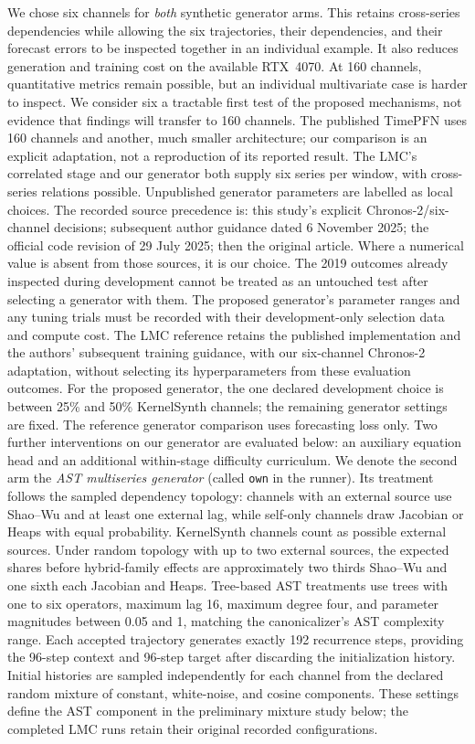 We chose six channels for \emph{both} synthetic generator arms. This retains
cross-series dependencies while allowing the six trajectories, their
dependencies, and their forecast errors to be inspected together in an
individual example. It also reduces generation and training cost on the
available RTX~4070. At 160 channels, quantitative metrics remain possible,
but an individual multivariate case is harder to inspect. We consider six a
tractable first test of the proposed mechanisms, not evidence that findings
will transfer to 160 channels. The published TimePFN uses 160 channels and
another, much smaller architecture; our comparison is an explicit adaptation,
not a reproduction of its reported result. The LMC's correlated stage and
our generator both supply six series per window, with cross-series relations
possible. Unpublished generator parameters are labelled as local
choices. The recorded source precedence is: this study's explicit
Chronos-2/six-channel decisions; subsequent author guidance dated
6 November 2025; the official code revision of 29 July 2025; then the
original article. Where a numerical value is absent from those sources,
it is our choice. The 2019 outcomes already inspected during development
cannot be treated as an untouched test after selecting a generator with them.
The proposed generator's parameter ranges and any tuning trials
must be recorded with their development-only selection data and compute
cost. The LMC reference retains the published implementation and the authors'
subsequent training guidance, with our six-channel Chronos-2 adaptation,
without selecting its hyperparameters from these evaluation outcomes. For the
proposed generator, the one declared development choice is between 25\% and
50\% KernelSynth channels; the remaining generator settings are fixed. The
reference generator comparison uses forecasting loss only. Two further
interventions on our generator are evaluated below: an auxiliary equation
head and an additional within-stage difficulty curriculum. We denote the
second arm the \emph{AST multiseries generator} (called \texttt{own} in the
runner). Its treatment follows the sampled dependency topology: channels
with an external source use Shao--Wu and at least one external lag, while
self-only channels draw Jacobian or Heaps with equal probability. KernelSynth
channels count as possible external sources. Under random topology with up to
two external sources, the expected shares before hybrid-family effects are
approximately two thirds Shao--Wu and one sixth each Jacobian and Heaps.
Tree-based AST treatments use trees with one to six operators, maximum lag 16,
maximum degree four, and
parameter magnitudes between 0.05 and 1, matching the canonicalizer's AST complexity
range. Each accepted trajectory generates exactly 192 recurrence steps,
providing the 96-step context and 96-step target after discarding the
initialization history. Initial histories are sampled independently for each
channel from the declared random mixture of constant, white-noise, and cosine
components. These settings define the AST component in the preliminary
mixture study below; the completed LMC runs retain their original recorded
configurations.

